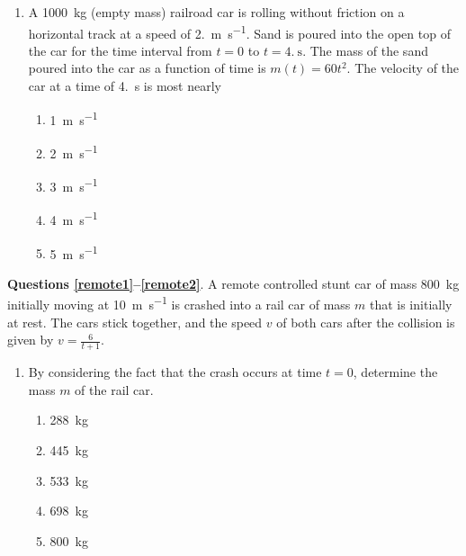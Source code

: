 \documentclass{../../../oss-apphys}
\begin{document}
\begin{multicols}{2}
\begin{enumerate}[resume,leftmargin=18pt]

  \item A \SI{1000}{\kilo\gram} (empty mass) railroad car is rolling without
    friction on a horizontal track at a speed of \SI{2.}{\metre\per\second}.
    Sand is poured into the open top of the car for the time interval from
    $t=0$ to $t=\SI{4.}{\second}$. The mass of the sand poured into the car as
    a function of time is $m(t)=60t^2$. The velocity of the car at a time of
    \SI{4.}{\second} is most nearly
    \begin{center}
    \end{center}
    \begin{enumerate}[noitemsep,topsep=0pt,leftmargin=18pt,label=(\Alph*)]
    \item\SI{1}{\metre\per\second}
    \item\SI{2}{\metre\per\second}
    \item\SI{3}{\metre\per\second}
    \item\SI{4}{\metre\per\second}
    \item\SI{5}{\metre\per\second}
    \end{enumerate}
  \end{enumerate}
  
  \textbf{Questions \ref{remote1}--\ref{remote2}}. A remote controlled stunt
  car of mass \SI{800}{\kilo\gram} initially moving at
  \SI{10}{\metre\per\second} is crashed into a rail car of mass $m$ that is
  initially at rest. The cars stick together, and the speed $v$ of both cars
  after the collision is given by $\displaystyle v=\frac{6}{t+1}$.

  \begin{enumerate}[resume,leftmargin=18pt]
  \item By considering the fact that the crash occurs at time $t=0$, determine
    the mass $m$ of the rail car.
    \label{remote1}
    \begin{enumerate}[noitemsep,topsep=0pt,leftmargin=18pt,label=(\Alph*)]
    \item\SI{288}{\kilo\gram}
    \item\SI{445}{\kilo\gram}
    \item\SI{533}{\kilo\gram}
    \item\SI{698}{\kilo\gram}
    \item\SI{800}{\kilo\gram}
    \end{enumerate}
    

\end{enumerate}
\end{multicols}
\end{document}
